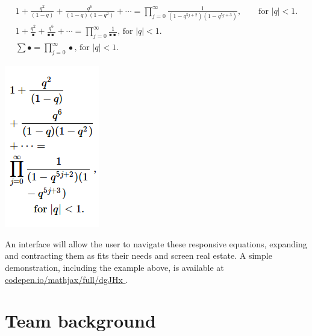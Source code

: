 \documentclass[12pt]{amsart}
\begin{document}
\begin{minipage}{.45\textwidth}

{\Tiny
\begin{gather*}
1 +  \frac{q^2}{(1-q)}+\frac{q^6}{(1-q)(1-q^2)}+\cdots =
\prod_{j=0}^{\infty}\frac{1}{(1-q^{5j+2})(1-q^{5j+3})},
\quad\quad \text{for $|q|<1$}. \\
1 +  \frac{q^2}{\bullet}+\frac{q^6}{\bullet\bullet}+\cdots =
\prod_{j=0}^{\infty}\frac{1}{\bullet\bullet}
 \text{, for $|q|<1$}.\\
\sum \bullet =
\prod_{j=0}^{\infty}\bullet 
 \text{, for $|q|<1$}.
\end{gather*}
 }
\end{minipage}
\hspace*{6em}\begin{minipage}{.3\textwidth}
\begin{center}
 
\qquad \qquad \includegraphics[width=.45 \textwidth]{linebreaking.png}
\end{center}

\end{minipage}


An interface will allow the user to navigate these responsive equations, expanding 
and contracting them as fits their needs and screen real estate. A simple 
demonstration, including the example above, is available at 
\href{http://codepen.io/mathjax/full/dgJHx}{codepen.io/mathjax/full/dgJHx }. 


\section{Team background}
\end{document}
